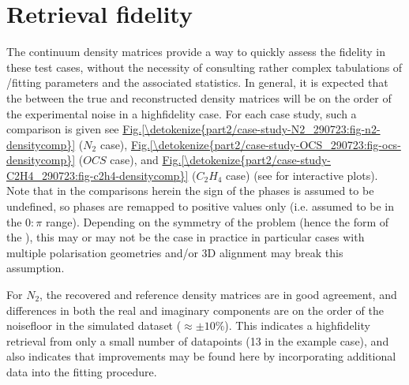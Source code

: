 \documentclass[letterpaper,table,10pt,english]{jupyterBook}
\begin{document}
\section{Retrieval fidelity}
\label{\detokenize{part2/case-study-summaries_240723:retrieval-fidelity}}
\sphinxAtStartPar
The continuum density matrices provide a way to quickly assess the {\hyperref[\detokenize{backmatter/glossary:term-bootstrap-retrieval-protocol}]{}} fidelity in these test cases, without the necessity of consulting rather complex tabulations of {\hyperref[\detokenize{backmatter/glossary:term-radial-matrix-elements}]{}}/fitting parameters and the associated statistics. In general, it is expected that the  between the true and reconstructed density matrices will be on the order of the experimental noise in a high\sphinxhyphen{}fidelity case. For each case study, such a comparison is given \sphinxhyphen{} see \hyperref[\detokenize{part2/case-study-N2_290723:fig-n2-densitycomp}]{Fig.\@ \ref{\detokenize{part2/case-study-N2_290723:fig-n2-densitycomp}}} (\(N_2\) case), \hyperref[\detokenize{part2/case-study-OCS_290723:fig-ocs-densitycomp}]{Fig.\@ \ref{\detokenize{part2/case-study-OCS_290723:fig-ocs-densitycomp}}} (\(OCS\) case), and \hyperref[\detokenize{part2/case-study-C2H4_290723:fig-c2h4-densitycomp}]{Fig.\@ \ref{\detokenize{part2/case-study-C2H4_290723:fig-c2h4-densitycomp}}} (\(C_2H_4\) case) (see  for interactive plots). Note that in the comparisons herein the sign of the phases is assumed to be undefined, so phases are remapped to positive values only (i.e. assumed to be in the \(0:\pi\) range). Depending on the symmetry of the problem (hence the form of the {\hyperref[\detokenize{backmatter/glossary:term-channel-functions}]{}}), this may or may not be the case in practice \sphinxhyphen{} in particular cases with multiple polarisation geometries and/or 3D alignment may break this assumption.

\sphinxAtStartPar
For \(N_2\), the recovered and reference density matrices are in good agreement, and differences in both the real and imaginary components are on the order of the noise\sphinxhyphen{}floor in the simulated dataset (\(\approx\pm10\%\)). This indicates a high\sphinxhyphen{}fidelity retrieval from only a small number of data\sphinxhyphen{}points (13 in the example case), and also indicates that improvements may be found here by incorporating additional data into the fitting procedure.
\end{document}
